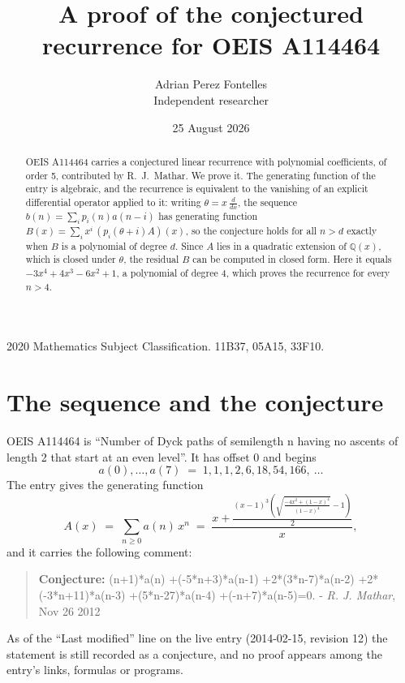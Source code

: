 \documentclass[11pt,a4paper]{article}
\title{A proof of the conjectured recurrence for OEIS A114464}
\author{Adrian Perez Fontelles\\ \small Independent researcher}
\date{25 August 2026}
\theoremstyle{plain}
\theoremstyle{definition}
\begin{document}
\maketitle

\begin{abstract}
OEIS A114464 carries a conjectured linear recurrence with polynomial coefficients, of
order 5, contributed by R.~J.~Mathar. We prove it. The generating function of the
entry is algebraic, and the recurrence is equivalent to the vanishing of an explicit
differential operator applied to it: writing $\theta=x\,\frac{d}{dx}$, the sequence
$b(n)=\sum_{i}p_{i}(n)a(n-i)$ has generating function
$B(x)=\sum_{i}x^{i}\,(p_{i}(\theta+i)A)(x)$, so the conjecture holds for all $n>d$ exactly
when $B$ is a polynomial of degree $d$. Since $A$ lies in a quadratic extension of
$\mathbb{Q}(x)$, which is closed under $\theta$, the residual $B$ can be computed in
closed form. Here it equals $- 3 x^{4} + 4 x^{3} - 6 x^{2} + 1$, a polynomial of degree $4$, which proves
the recurrence for every $n>4$.
\end{abstract}

\noindent\small 2020 Mathematics Subject Classification. 11B37, 05A15, 33F10.\normalsize

\section{The sequence and the conjecture}

OEIS A114464 is ``Number of Dyck paths of semilength n having no ascents of length 2 that start at an even level''. It has offset $0$ and begins
\[
a(0),\dots,a(7)\;=\;1, 1, 1, 2, 6, 18, 54, 166,\ \dots
\]
The entry gives the generating function
\begin{equation}\label{eq:gf}
A(x)\;=\;\sum_{n\ge 0} a(n)\,x^{n}\;=\;\frac{x + \frac{\left(x - 1\right)^{3} \left(\sqrt{\frac{- 4 x^{2} + \left(1 - x\right)^{4}}{\left(1 - x\right)^{4}}} - 1\right)}{2}}{x} ,
\end{equation}
and it carries the following comment:
\begin{quote}\small
\textbf{Conjecture:} (n+1)*a(n) +(-5*n+3)*a(n-1) +2*(3*n-7)*a(n-2) +2*(-3*n+11)*a(n-3) +(5*n-27)*a(n-4) +(-n+7)*a(n-5)=0. - \emph{R. J. Mathar}, Nov 26 2012
\end{quote}
As of the ``Last modified'' line on the live entry (2014-02-15, revision 12) the
statement is still recorded as a conjecture, and no proof appears among the entry's links,
formulas or programs.
\end{document}
